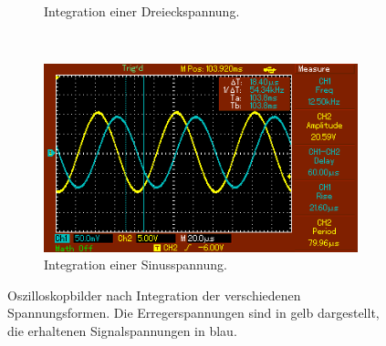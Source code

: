 \begin{figure}
\begin{subfigure}{0.49\textwidth}
    \qquad
    \caption{Integration einer Dreieckspannung.}
    \label{sub:2}
  \end{subfigure}\\
  \begin{subfigure}{0.49\textwidth}
  \centering
    \includegraphics[width=\textwidth]{sinus.png}
    \qquad
    \caption{Integration einer Sinusspannung.}
    \label{sub:3}
  \end{subfigure}
  \caption{Oszilloskopbilder nach Integration der verschiedenen Spannungsformen.
  Die Erregerspannungen sind in gelb dargestellt, die erhaltenen Signalspannungen in blau.}
\label{abb:4}
\end{figure}
